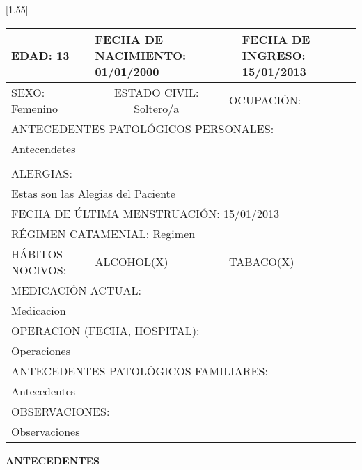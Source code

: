 \documentclass[10pt,a4paper]{article}
\begin{document}
\vspace{0.5cm}
\scalebox{1.40}[1.55]{
\begin{tabular}{|p{2cm}p{2cm}p{3cm}p{2cm}|} 
\hline 
\multicolumn{1}{|l}{\scriptsize{EDAD: 13}}& \multicolumn{2}{l}{ \scriptsize{FECHA DE NACIMIENTO: 01/01/2000}}& \multicolumn{1}{l|}{ \scriptsize{FECHA DE INGRESO: 15/01/2013}}\\
\hline 
\multicolumn{1}{|l}{\scriptsize{SEXO: Femenino}}& \multicolumn{1}{c}{ \scriptsize{ESTADO CIVIL: Soltero/a}}& \multicolumn{2}{p{6cm}|}{ \scriptsize{OCUPACI\'ON: }}\\  
\hline 
\multicolumn{4}{|l|}{\scriptsize{ANTECEDENTES PATOL\'OGICOS PERSONALES:}}\\
\multicolumn{4}{|p{12.5cm}|}{\scriptsize{Antecendetes	}}\\ 
 & && \\
\hline 
\multicolumn{4}{|l|}{\scriptsize{ALERGIAS:}}\\ 
\multicolumn{4}{|p{12.5cm}|}{\scriptsize{Estas son las Alegias del Paciente}}\\ 
\hline 
\multicolumn{4}{|l|}{\scriptsize{FECHA DE \'ULTIMA MENSTRUACI\'ON: 15/01/2013}}\\ 
\hline 
\multicolumn{4}{|l|}{\scriptsize{R\'EGIMEN CATAMENIAL: Regimen}}\\
\hline 
\multicolumn{1}{|l}{\scriptsize{H\'ABITOS NOCIVOS:}}& \multicolumn{1}{l}{\scriptsize{ALCOHOL(X)}}&\multicolumn{2}{l|}{\scriptsize{TABACO(X)}}\\
\hline 
\multicolumn{4}{|l|}{\scriptsize{MEDICACI\'ON ACTUAL:}}\\
\multicolumn{4}{|p{12.5cm}|}{\scriptsize{Medicacion	}}\\ 
\hline 
\multicolumn{4}{|l|}{\scriptsize{OPERACION (FECHA, HOSPITAL): }}\\
\multicolumn{4}{|p{12.5cm}|}{\scriptsize{Operaciones}}\\ 
\hline 
\multicolumn{4}{|l|}{\scriptsize{ANTECEDENTES PATOL\'OGICOS FAMILIARES:}}\\
\multicolumn{4}{|p{12.5cm}|}{\scriptsize{Antecedentes}}\\ 
\hline 
\multicolumn{4}{|l|}{\scriptsize{OBSERVACIONES:}}\\
\multicolumn{4}{|p{12.5cm}|}{\scriptsize{Observaciones}}\\ 
\hline 
\end{tabular}}
\vspace{0.6cm}
\hspace{13cm}
\begin{flushleft}
\begin{LARGE}
\textbf{ANTECEDENTES}
\end{LARGE}
\end{flushleft}
\end{document}
